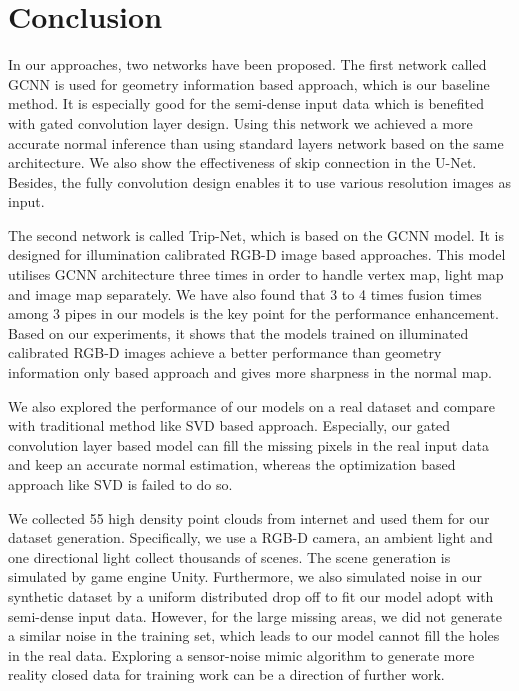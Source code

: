 
\chapter{Conclusion} %

\label{ch:06} %

In our approaches, two networks have been proposed. The first network called GCNN is used for geometry information based approach, which is our baseline method. It is especially good for the semi-dense input data which is benefited with gated convolution layer design.  Using this network we achieved a more accurate normal inference than using standard layers network based on the same architecture. We also show the effectiveness of skip connection in the U-Net. Besides, the fully convolution design enables it to use various resolution images as input. 

The second network is called Trip-Net, which is based on the GCNN model. It is designed for illumination calibrated RGB-D image based approaches. This model utilises GCNN architecture three times in order to handle vertex map, light map and image map separately. We have also found that 3 to 4 times fusion times among 3 pipes in our models is the key point for the performance enhancement.
Based on our experiments, it shows that the models trained on illuminated calibrated RGB-D images achieve a  better performance than geometry information only based approach and gives more sharpness in the normal map.

We also explored the performance of our models on a real dataset and compare with traditional method like SVD based approach. Especially, our gated convolution layer based model can fill the missing pixels in the real input data and keep an accurate normal estimation, whereas the optimization based approach like SVD is failed to do so. 


We collected 55 high density point clouds from internet and used them for our dataset generation. Specifically, we use a RGB-D camera, an ambient light and one directional light  collect thousands of scenes. The scene generation is simulated by game engine Unity. Furthermore, we also simulated noise in our synthetic dataset by a uniform distributed drop off to fit our model adopt with semi-dense input data.
However, for the large missing areas, we did not generate a similar noise in the training set, which leads to our model cannot fill the holes in the real data. Exploring a sensor-noise mimic algorithm to generate more reality closed data for training work can be a direction of further work.
